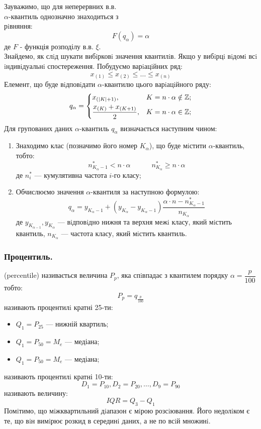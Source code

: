 Зауважимо, що для неперервних в.в. \\ $\alpha$-квантиль однозначно знаходиться з\\ рiвняння:
$$
F(q_{\alpha}) = \alpha
$$
де $F$ - функція розподілу в.в. $\xi$.\\
Знайдемо, як слiд шукати вибiрковi значення квантилiв. Якщо у вибiрцi вiдомi всi iндивiдуальнi спостереження. Побудуємо варiацiйних ряд:
$$
x_{(1)} \leq x_{(2)} \leq  \dots \leq x_{(n)}
$$
Елемент, що буде вiдповiдати $\alpha$-квантилю цього варiацiйного ряду:
$$
q_{\alpha} = \begin{dcases}
x_{( \left| K \right| + 1 )} , & K = n\cdot \alpha \notin \mathbb{Z};\\
\frac{x_{(K)} + x_{( K + 1 )}}{2} , & K = n\cdot \alpha \in \mathbb{Z};\\
\end{dcases}
$$
Для групованих даних $\alpha$-квантиль $q_{\alpha}$ визначається наступним чином:
\begin{enumerate}
    \item Знаходимо клас (позначимо його номер $K_{\alpha}$), що буде мiстити $\alpha$-квантиль, тобто:
    $$
    n_{K_{\alpha} -1}^* < n \cdot \alpha \qquad \quad n_{K_{\alpha}}^* \geq n \cdot \alpha
    $$
    де $n_i^*$ --- кумулятивна частота $i$-го класу;
    \item Обчислюємо значення $\alpha$-квантиля за наступною формулою:
    $$
    q_{\alpha} = y_{K_{\alpha} -1} + (y_{K_{\alpha}} - y_{K_{\alpha}-1}) \frac{\alpha \cdot n - n^*_{K_{\alpha}-1}}{n_{K_{\alpha}}}
    $$
    де $y_{K_{\alpha-1}}, y_{K_{\alpha}}$ --- вiдповiдно нижня та верхня межi класу, який мiстить квантиль, $n_{K_{\alpha}}$ --- частота класу, який мiстить квантиль.
\end{enumerate}
\subsubsection{Процентиль.}
 (percentile) називається величина $P_p$, яка спiвпадає з квантилем порядку $\alpha = \dfrac{p}{100} $ тобто:
$$
P_p = q_{ \frac{p}{100} }
$$
 називають процентилi кратні 25-ти:
\begin{itemize}
    \item $Q_1 = P_{25}$ --- нижній квартиль;
    \item $Q_1 = P_{50} = M_e$ --- медіана;
    \item $Q_1 = P_{50} = M_e$ --- медіана;
\end{itemize}
 називають процентилi кратні 10-ти:
$$
D_1 = P_{10} , D_2 = P_{20} , \dots , D_9 = P_{90}
$$
 називають величину:
$$
IQR = Q_3 - Q_1
$$
Помiтимо, що мiжквартильний дiапазон є мiрою розсiювання. Його недолiком є те, що вiн вимiрює розкид в серединi
даних, а не по всiй множинi.
